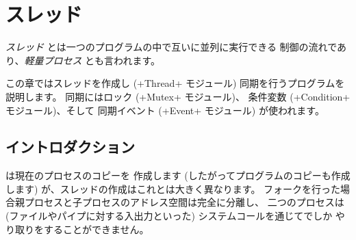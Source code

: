 %
%

\chapter{\label{sec/coprocessus}スレッド}

\emph{スレッド} とは一つのプログラムの中で互いに並列に実行できる
制御の流れであり、\emph{軽量プロセス} とも言われます。

この章ではスレッドを作成し (\ml+Thread+ モジュール) 同期を行うプログラムを説明します。
同期にはロック (\ml+Mutex+ モジュール)、 条件変数 (\ml+Condition+ モジュール)、そして
同期イベント (\ml+Event+ モジュール) が使われます。

\section{イントロダクション}

 は現在のプロセスのコピーを
作成します (したがってプログラムのコピーも作成します) が、スレッドの作成はこれとは大きく異なります。
フォークを行った場合親プロセスと子プロセスのアドレス空間は完全に分離し、
二つのプロセスは (ファイルやパイプに対する入出力といった) システムコールを通じてでしか
やり取りをすることができません。

